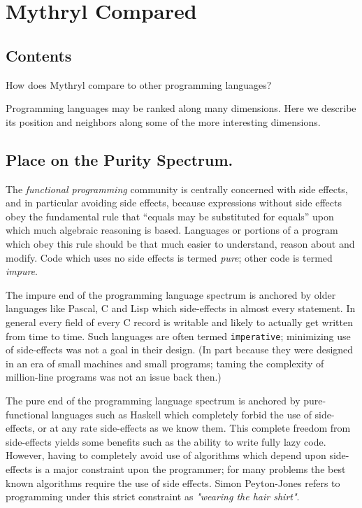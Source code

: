 \chapter{Mythryl Compared}

%
%

\section{Contents}

How does Mythryl compare to other programming languages?

Programming languages may be ranked along many dimensions.  Here we 
describe its position and neighbors along some of the more interesting 
dimensions.


\section{Place on the Purity Spectrum.}

The {\it functional programming} community is centrally concerned with 
side effects, and in particular avoiding side effects, because expressions 
without side effects obey the fundamental rule that ``equals may be substituted 
for equals'' upon which much algebraic reasoning is based.  Languages or 
portions of a program which obey this rule should be that much easier 
to understand, reason about and modify.  Code which uses no side effects 
is termed {\it pure};  other code is termed {\it impure}.

The impure end of the programming language spectrum is anchored by 
older languages like Pascal, C and Lisp which side-effects in almost 
every statement.  In general every field of every C record is writable 
and likely to actually get written from time to time.  Such languages are 
often termed {\tt imperative};  minimizing use of side-effects was not a 
goal in their design.  (In part because they were designed in an era of 
small machines and small programs;  taming the complexity of million-line 
programs was not an issue back then.)

The pure end of the programming language spectrum is anchored by pure-functional 
languages such as Haskell which completely forbid the use of side-effects, or 
at any rate side-effects as we know them.  This complete freedom from side-effects 
yields some benefits such as the ability to write fully lazy code.  However, having 
to completely avoid use of algorithms which depend upon side-effects is a major 
constraint upon the programmer;  for many problems the best known algorithms require 
the use of side effects.  Simon Peyton-Jones refers to programming under this strict 
constraint as {\it "wearing the hair shirt"}.

